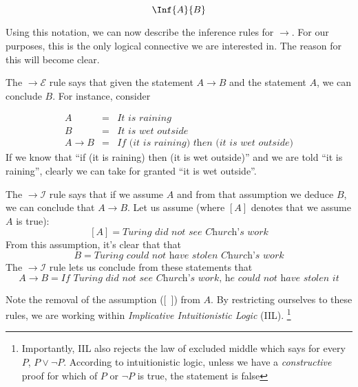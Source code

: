   \[
    \Inf{A}{B} 
  \]
  
  Using this notation, we can now describe the inference rules for $\to$.
  For our purposes, this is the only logical connective we are interested in.
  The reason for this will become clear.
  
  
  The $\to\mathcal{E}$ rule says that given the statement $A \to B$ and the statement $A$,
  we can conclude $B$.
  For instance, consider 
 
  \[
  \begin{array}{lcl}
    A & = & \textit{It is raining} \\
    B & = & \textit{It is wet outside} \\
    A \to B & = & \textit{If (it is raining) then (it is wet outside)}
  \end{array}
  \]
  If we know that ``if (it is raining) then (it is wet outside)'' and we are told ``it is raining'',
  clearly we can take for granted ``it is wet outside''.
  
  The $\to\mathcal{I}$ rule says that if we assume $A$ and from that assumption we deduce $B$,
  we can conclude that $A \to B$.
  Let us assume (where $[A]$ denotes that we assume $A$ is true): 
  \[
    [A] = \textit{Turing did not see Church's work} 
  \]
  From this assumption, it's clear that that 
  \[
    B = \textit{Turing could not have stolen Church's work} 
  \]
  The $\to\mathcal{I}$ rule lets us conclude from these statements that
  \[
    A \to B = \textit{If Turing did not see Church's work, he could not have stolen it}
  \]
 
  Note the removal of the assumption ([\ ]) from $A$.
  By restricting ourselves to these rules, we are working within \emph{Implicative Intuitionistic Logic} (IIL).
  \footnote{Importantly, IIL also rejects the law of excluded middle which says for every $P$, $P \lor \neg P$.
  According to intuitionistic logic, unless we have a \emph{constructive} proof for which of $P$ or $\neg P$ is true, the statement is false}
  

